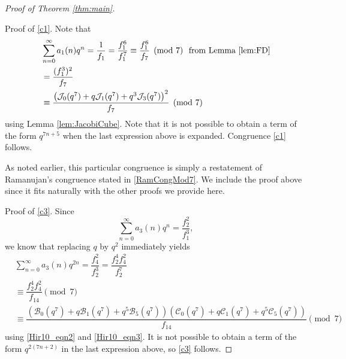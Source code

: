 \documentclass[10pt, reqno]{amsart}
\theoremstyle{theorem}
\theoremstyle{definition}
\theoremstyle{example}
\begin{document}
\begin{proof}[Proof of Theorem \ref{thm:main}]

\ 

\medskip 

\noindent
Proof of \eqref{c1}.
Note that 
\begin{align*}
& 
\sum_{n=0}^\infty a_1(n)q^n =
\dfrac{1}{f_1} 
=
\dfrac{f_1^6}{f_1^7} 
\equiv
\dfrac{f_1^6}{f_7}  \pmod{7} \text{\ \ from Lemma \ref{lem:FD}} \\
&=
\dfrac{(f_1^3)^2}{f_7} \\
&\equiv 
\dfrac{\left( \mathcal{J}_0(q^7) + q\mathcal{J}_1(q^7) + q^3\mathcal{J}_3(q^7) \right)^2}{f_7}
\pmod{7}
\end{align*}
using Lemma \ref{lem:JacobiCube}.  
Note that it is not possible to obtain a term of the form $q^{7n+5}$ when the last expression above is expanded.  Congruence \eqref{c1} follows.  

As noted earlier, this particular congruence is simply a restatement of Ramanujan's congruence stated in \eqref{RamCongMod7}.  We include the proof above since it fits naturally with the other proofs we provide here.    

\medskip 

\noindent
Proof of \eqref{c3}.
Since 
$$
\sum_{n=0}^\infty a_3(n)q^n
=
\dfrac{f_2^2}{f_1^3}, 
$$
we know that replacing $q$ by $q^2$ immediately yields 
\begin{align*}
&\sum_{n=0}^\infty a_3(n)q^{2n}
=
\dfrac{f_4^2}{f_2^3}
=
\dfrac{f_2^4f_4^2}{f_2^7} 
\\
&\equiv
\dfrac{f_2^4f_4^2}{f_{14}} \pmod{7}  \\ %
&\equiv 
\dfrac{  \left( \mathcal{B}_0(q^7) + q\mathcal{B}_1(q^7)+q^5\mathcal{B}_5(q^7) \right)  \left( \mathcal{C}_0(q^7) + q\mathcal{C}_1(q^7)+q^5\mathcal{C}_5(q^7) \right)     }{f_{14}} \pmod{7}
\end{align*}
using \eqref{Hir10_eqn2} and \eqref{Hir10_eqn3}.  
It is not possible to obtain a term of the form $q^{2(7n+2)}$ in the last expression above, so \eqref{c3} follows.




\medskip 


\end{proof}
\end{document}
